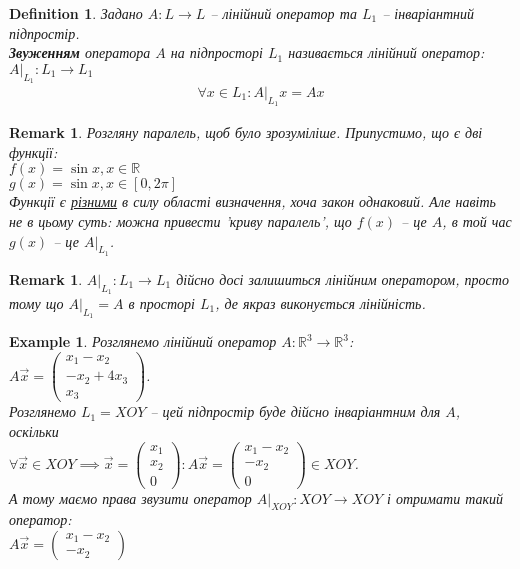\documentclass[a4paper, 10pt]{article}
\theoremstyle{theoremdd}
\newtheorem{definition}[theorem]{Definition}
\newtheorem{example}[theorem]{Example}
\newtheorem{remark}[theorem]{Remark}
\begin{document}
\begin{definition}
Задано $A \colon L \to L$ -- лінійний оператор та $L_1$ -- інваріантний підпростір.\\
\textbf{Звуженням} оператора $A$ на підпросторі $L_1$ називається лінійний оператор: $A |_{L_1} \colon L_1 \to L_1$
\begin{align*}
\forall x \in L_1: A |_{L_1}x = Ax
\end{align*}
\end{definition}

\begin{remark}
Розгляну паралель, щоб було зрозуміліше. Припустимо, що є дві функції:\\
$f(x) = \sin x, x \in \mathbb{R}$\\
$g(x) = \sin x, x \in [0,2\pi]$\\
Функції є \underline{різними} в силу області визначення, хоча закон однаковий. Але навіть не в цьому суть: можна привести 'криву паралель', що $f(x)$ -- це $A$, в той час $g(x)$ -- це $A |_{L_1}$.
\end{remark}

\begin{remark}
$A|_{L_1} \colon L_1 \to L_1$ дійсно досі залишиться лінійним оператором, просто тому що $A|_{L_1} = A$ в просторі $L_1$, де якраз виконується лінійність.
\end{remark}

\iffalse
\begin{example}
Розглянемо лінійний оператор $A \colon \mathbb{R}^3 \to \mathbb{R}^3$:\\
$A \vec{x} = \begin{pmatrix}
x_1 - x_2 \\ -x_2 + 4x_3 \\ x_3
\end{pmatrix}$.\\
Розглянемо $L_1 = XOY$ -- цей підпростір буде дійсно інваріантним для $A$, оскільки\\
$\forall \vec{x} \in XOY \implies \vec{x} = \begin{pmatrix}
x_1 \\ x_2 \\ 0
\end{pmatrix}: A \vec{x} = \begin{pmatrix}
x_1 - x_2 \\ -x_2 \\ 0
\end{pmatrix} \in XOY$.\\
А тому маємо права звузити оператор $A|_{XOY}: XOY \to XOY$ і отримати такий оператор:\\
$A \vec{x} = \begin{pmatrix}
x_1 - x_2 \\ -x_2
\end{pmatrix}$
\end{example}
\end{document}
